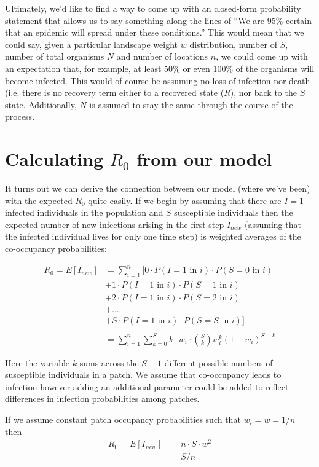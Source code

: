 Ultimately, we'd like to find a way to come up with an closed-form probability statement that allows us to say something along the lines of ``We are 95\% certain that an epidemic will spread under these conditions.'' This would mean that we could say, given a particular landscape weight $w$ distribution, number of $S$, number of total organisms $N$ and number of locations $n$, we could come up with an expectation that, for example, at least 50\% or even 100\% of the organisms will become infected. This would of course be assuming no loss of infection nor death (i.e. there is no recovery term either to a recovered state ($R$), nor back to the $S$ state. Additionally, $N$ is assumed to stay the same through the course of the process.

\section*{Calculating $R_0$ from our model}

It turns out we can derive the connection between our model (where we've been) with the expected $R_0$ quite easily.  If we begin by assuming that there are $I=1$ infected individuals in the population and $S$ susceptible individuals then the expected number of new infections arising in the first step $I_{new}$ (assuming that the infected individual lives for only one time step) is weighted averages of the co-occupancy probabilities: 

\begin{align}
R_0=E[I_{new}]&=\sum_{i=1}^{n}[ 0\cdot P(I=1 \text{ in }i) \cdot P(S=0 \text{ in }i) \\
&+1\cdot P(I=1 \text{ in } i) \cdot P(S=1 \text{ in }i) \\
&+2\cdot P(I=1 \text{ in } i) \cdot P(S=2 \text{ in }i) \\
&+ \dots\\
&+S\cdot P(I=1 \text{ in } i) \cdot P(S=S \text{ in }i)] \\
&\\
&=\sum_{i=1}^{n}\sum_{k=0}^S k \cdot w_i \cdot \binom{S}{k}w_i^k(1-w_i)^{S-k}
\end{align}

Here the variable $k$ sums across the $S+1$ different possible numbers of susceptible individuals in a patch.   We assume that co-occupancy leads to infection however adding an additional parameter could be added to reflect differences in infection probabilities among patches.   

If we assume constant patch occupancy probabilities such that $w_i=w=1/n$ then
\begin{align}
R_0=E[I_{new}]&=n \cdot S \cdot w^2\\
&=S/n
\end{align}

